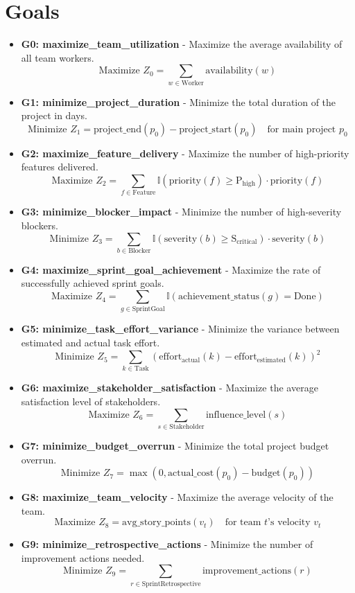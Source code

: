\documentclass[11pt]{article}
\begin{document}
\section{Goals}
\begin{itemize}
    \item \textbf{G0: maximize\_team\_utilization} - Maximize the average availability of all team workers.
        \[ \text{Maximize } Z_0 = \sum_{w \in \text{Worker}} \text{availability}(w) \]
    \item \textbf{G1: minimize\_project\_duration} - Minimize the total duration of the project in days.
        \[ \text{Minimize } Z_1 = \text{project\_end}(p_0) - \text{project\_start}(p_0) \quad \text{for main project } p_0 \]
    \item \textbf{G2: maximize\_feature\_delivery} - Maximize the number of high-priority features delivered.
        \[ \text{Maximize } Z_2 = \sum_{f \in \text{Feature}} \mathbb{I}(\text{priority}(f) \geq \text{P}_{\text{high}}) \cdot \text{priority}(f) \]
    \item \textbf{G3: minimize\_blocker\_impact} - Minimize the number of high-severity blockers.
        \[ \text{Minimize } Z_3 = \sum_{b \in \text{Blocker}} \mathbb{I}(\text{severity}(b) \geq \text{S}_{\text{critical}})\cdot \text{severity}(b) \]
    \item \textbf{G4: maximize\_sprint\_goal\_achievement} - Maximize the rate of successfully achieved sprint goals.
        \[ \text{Maximize } Z_4 = \sum_{g \in \text{SprintGoal}} \mathbb{I}(\text{achievement\_status}(g) = \text{Done}) \]
    \item \textbf{G5: minimize\_task\_effort\_variance} - Minimize the variance between estimated and actual task effort.
        \[ \text{Minimize } Z_5 = \sum_{k \in \text{Task}} (\text{effort}_{\text{actual}}(k) - \text{effort}_{\text{estimated}}(k))^2 \]
    \item \textbf{G6: maximize\_stakeholder\_satisfaction} - Maximize the average satisfaction level of stakeholders.
        \[ \text{Maximize } Z_6 = \sum_{s \in \text{Stakeholder}} \text{influence\_level}(s) \]
    \item \textbf{G7: minimize\_budget\_overrun} - Minimize the total project budget overrun.
        \[ \text{Minimize } Z_7 = \max(0, \text{actual\_cost}(p_0) - \text{budget}(p_0)) \]
    \item \textbf{G8: maximize\_team\_velocity} - Maximize the average velocity of the team.
        \[ \text{Maximize } Z_8 = \text{avg\_story\_points}(v_t) \quad \text{for team } t\text{'s velocity } v_t \]
    \item \textbf{G9: minimize\_retrospective\_actions} - Minimize the number of improvement actions needed.
        \[ \text{Minimize } Z_9 = \sum_{r \in \text{SprintRetrospective}} \text{improvement\_actions}(r) \]
\end{itemize}
\end{document}
